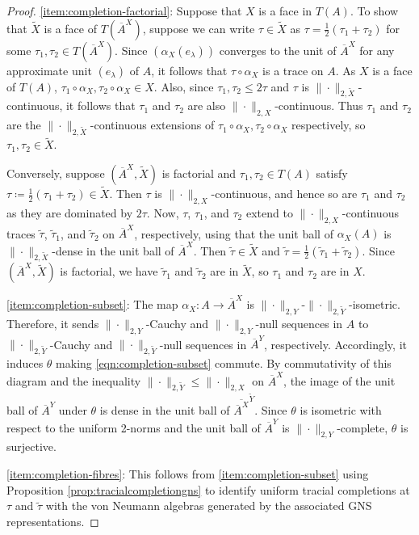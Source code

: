 \documentclass[a4paper,11pt]{amsart}
\theoremstyle{definition}
\numberwithin{equation}{section}
\numberwithin{theorem}{section}
\newcommand{\completion}[2]{\overline{#1}^{#2}}
\begin{document}
\begin{proof}
	\ref{item:completion-factorial}: Suppose that $X$ is a face in $T(A)$.  To show that $\widetilde{X}$ is a face of $T(\completion{A}{X})$, suppose we can write $\tau \in \widetilde{X}$ as $\tau = \frac12(\tau_1+\tau_2)$ for some $\tau_1,\tau_2 \in T(\completion{A}{X})$. Since $(\alpha_X(e_\lambda))$ converges to the unit of $\completion{A}{X}$ for any approximate unit $(e_\lambda)$ of $A$, it follows that $\tau \circ \alpha_X$ is a trace on $A$. As $X$ is a face of $T(A)$, $\tau_1\circ\alpha_X, \tau_2\circ\alpha_X \in X$. Also, since $\tau_1,\tau_2 \leq 2\tau$ and $\tau$ is $\|\cdot\|_{2,\widetilde{X}}$-continuous, it follows that $\tau_1$ and $\tau_2$ are also $\|\cdot\|_{2, X}$-continuous. Thus $\tau_1$ and $\tau_2$ are the $\|\cdot\|_{2,\widetilde{X}}$-continuous extensions of $\tau_1 \circ \alpha_X,\tau_2 \circ \alpha_X$ respectively, so $\tau_1,\tau_2 \in \widetilde{X}$.
	
	Conversely, suppose $(\completion{A}{X}, \widetilde{X})$ is factorial and $\tau_1, \tau_2 \in T(A)$ satisfy $\tau \coloneqq \frac12(\tau_1 + \tau_2) \in \widetilde X$.  Then $\tau$ is $\|\cdot\|_{2, X}$-continuous, and hence so are $\tau_1$ and $\tau_2$ as they are dominated by $2 \tau$.  Now, $\tau$, $\tau_1$, and $\tau_2$ extend  to $\|\cdot\|_{2, X}$-continuous traces $\widetilde\tau$, $\widetilde\tau_1$, and $\widetilde{\tau}_2$ on $\completion{A}{X}$, respectively, using that the unit ball of $\alpha_X(A)$ is $\|\cdot\|_{2, \widetilde{X}}$-dense in the unit ball of $\completion{A}{X}$. Then $\widetilde\tau \in \widetilde{X}$ and $\widetilde\tau = \frac12 (\widetilde\tau_1 + \widetilde\tau_2)$.  Since $(\completion{A}{X}, \widetilde{X})$ is factorial, we have $\widetilde\tau_1$ and $\widetilde\tau_2$ are in $\widetilde{X}$, so $\tau_1$ and $\tau_2$ are in $X$.

 \ref{item:completion-subset}: The map $\alpha_X\colon A\to\completion{A}{X}$ is $\|\cdot\|_{2,Y}$-$\|\cdot\|_{2,\widetilde{Y}}$-isometric. Therefore, it sends $\|\cdot\|_{2,Y}$-Cauchy and $\|\cdot\|_{2,Y}$-null sequences in $A$ to $\|\cdot\|_{2,\widetilde{Y}}$-Cauchy and $\|\cdot\|_{2,\widetilde{Y}}$-null sequences in $\completion{A}{Y}$, respectively.  Accordingly, it induces $\theta$ making \eqref{eqn:completion-subset} commute.
 By commutativity of this diagram and the inequality $\|\cdot\|_{2, \widetilde Y} \leq \|\cdot\|_{2, X}$ on $\completion{A}{X}$, the image of the unit ball of $\completion{A}{Y}$ under $\theta$ is dense in the unit ball of $\completion{\completion{A}{X}}{\widetilde Y}$.  Since $\theta$ is isometric with respect to the uniform 2-norms and the unit ball of $\completion{A}{Y}$ is $\|\cdot\|_{2, Y}$-complete, $\theta$ is surjective.
 
\ref{item:completion-fibres}: This follows from \ref{item:completion-subset} using Proposition \ref{prop:tracialcompletiongns} to identify uniform tracial completions at $\tau$ and $\widetilde{\tau}$ with the von Neumann algebras generated by the associated GNS representations.

\end{proof}
\end{document}
